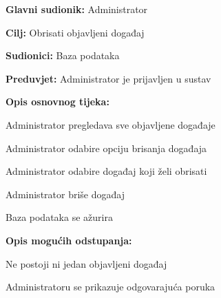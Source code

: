 				
				\noindent {}
				\begin{packed_item}
					
					\item \textbf{Glavni sudionik:} Administrator
					\item  \textbf{Cilj:} Obrisati objavljeni događaj
					\item  \textbf{Sudionici:} Baza podataka
					\item  \textbf{Preduvjet:} Administrator je prijavljen u sustav
					\item  \textbf{Opis osnovnog tijeka:}
					
					\item[] \begin{packed_enum}
						
						\item Administrator pregledava sve objavljene događaje
						\item Administrator odabire opciju brisanja događaja
						\item Administrator odabire događaj koji želi obrisati
						\item Administrator briše događaj
						\item Baza podataka se ažurira
					\end{packed_enum}
					
					\item  \textbf{Opis mogućih odstupanja:}
					
					\item[] \begin{packed_item}
						
						\item[1.a] Ne postoji ni jedan objavljeni događaj
						\item[] \begin{packed_enum}
							
							\item Administratoru se prikazuje odgovarajuća poruka
							
						\end{packed_enum}
						
					\end{packed_item}
				\end{packed_item}
				
